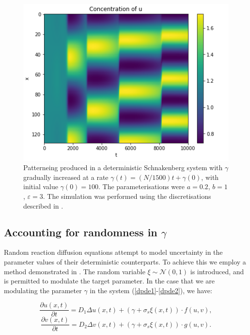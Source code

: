 \documentclass[12pt]{article}
\begin{document}
\begin{figure}
\begin{center}
  \includegraphics[scale = 0.65]{Fig_4.png}
  \caption{Patterneing produced in a deterministic Schnakenberg system with $\gamma$ gradually increased at a rate $\gamma(t) = (N/1500)t + \gamma(0)$, with initial value $\gamma(0) = 100$. The parameterisations were $a=0.2$, $b=1$, $\varepsilon = 3$. The simulation was performed using the discretisations described in . }
  \end{center}
\end{figure}
\subsection{Accounting for randomness in $\gamma$}
Random reaction diffusion equations attempt to model uncertainty in the parameter values of their deterministic counterparts. To achieve  this we employ a method demonstrated in \cite{Zhonghuai}. The random variable $\xi \sim \mathcal{N}(0,1)$ is introduced, and is permitted to modulate the target parameter. In the case that we are modulating the parameter $\gamma$ in the system (\ref{dpde1}-\ref{dpde2}), we have: 

\begin{equation} \label{StochGamma1}
\frac{\partial u(x,t)}{\partial t} = D_1\Delta u(x,t) + (\gamma + \sigma_s\xi(x,t)) \cdot f(u,v),
\end{equation}
\begin{equation} \label{StochGamma2}
\frac{\partial v(x,t)}{\partial t} = D_2\Delta v(x,t) + (\gamma + \sigma_s \xi(x,t)) \cdot g(u,v).
\end{equation}
\end{document}
